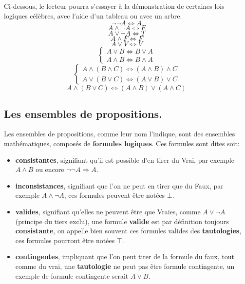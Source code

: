 \documentclass[a4paper, 12pt]{article}
\newcommand{\ffi}{\Leftrightarrow}
\newcommand{\imply}{\Rightarrow}
\numberwithin{equation}{subsection}
\begin{document}
    Ci-dessous, le lecteur pourra s'essayer à la démonstration de certaines lois logiques célèbres, avec l'aide d'un tableau ou avec un arbre. \\[1.0cm]
  \begin{equation}\neg \neg A \ffi A \end{equation}
  \begin{equation} A \land \neg A \ffi F \end{equation}
  \begin{equation} A \lor \neg A \ffi T \end{equation}
  \begin{equation} A \land F \ffi F \end{equation}
  \begin{equation} A \lor V \ffi V \end{equation}
  \begin{equation}
    \begin{cases}
      A \lor B \ffi B \lor A \\
      A \land B \ffi B \land A
    \end{cases}
  \end{equation}
  \begin{equation}
    \begin{cases}
      A \land (B \land C) \ffi (A \land B) \land C \\
      A \lor (B \lor C) \ffi (A \lor B) \lor C
    \end{cases}
  \end{equation}
  \begin{equation}A \land (B \lor C) \ffi (A \land B) \lor (A \land C) \end{equation}
  \subsection{Les ensembles de propositions.}
  Les ensembles de propositions, comme leur nom l'indique, sont des ensembles mathématiques, composés de {\bf formules logiques}.
  Ces formules sont dites soit: \\

  \begin{itemize}
  \item {\bf consistantes}, signifiant qu'il est possible d'en tirer du Vrai, par exemple $A \land B$ ou encore $\neg \neg A \imply A$.
  \item {\bf inconsistances}, signifiant que l'on ne peut en tirer que du Faux, par exemple $A \land \neg A$, ces formules peuvent être notées $\bot$.
  \item {\bf valides}, signifiant qu'elles ne peuvent être que Vraies, comme $A \lor \neg A$ (principe du tiers exclu), une formule {\bf valide} est par définition toujours {\bf consistante}, on appelle bien souvent ces formules valides des {\bf tautologies}, ces formules pourront être notées $\top$. \\
  \item {\bf contingentes}, impliquant que l'on peut tirer de la formule du faux, tout comme du vrai, une {\bf tautologie} ne peut pas être formule contingente,
  un exemple de formule contingente serait $A \lor B$.
  \end{itemize}
\end{document}
